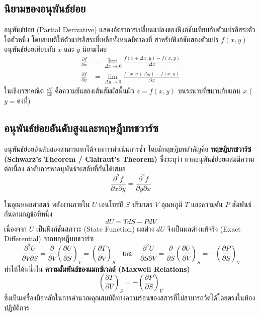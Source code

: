 \subsection{นิยามของอนุพันธ์ย่อย}
อนุพันธ์ย่อย (Partial Derivative) แสดงอัตราการเปลี่ยนแปลงของฟังก์ชันเทียบกับตัวแปรอิสระตัวใดตัวหนึ่ง โดยสมมติให้ตัวแปรอิสระที่เหลือทั้งหมดมีค่าคงที่ สำหรับฟังก์ชันสองตัวแปร $f(x, y)$ อนุพันธ์ย่อยเทียบกับ $x$ และ $y$ นิยามโดย
\begin{align}
\frac{\partial f}{\partial x} &= \lim_{\Delta x \to 0} \frac{f(x + \Delta x, y) - f(x, y)}{\Delta x} \\
\frac{\partial f}{\partial y} &= \lim_{\Delta y \to 0} \frac{f(x, y + \Delta y) - f(x, y)}{\Delta y}
\end{align}
ในเชิงเรขาคณิต $\frac{\partial f}{\partial x}$ คือความชันของเส้นสัมผัสพื้นผิว $z = f(x, y)$ บนระนาบที่ขนานกับแกน $x$ ($y = \text{คงที่}$)

\subsection{อนุพันธ์ย่อยอันดับสูงและทฤษฎีบทชวาร์ซ}
อนุพันธ์ย่อยอันดับสองสามารถหาได้จากการดำเนินการซ้ำ โดยมีทฤษฎีบทสำคัญคือ \textbf{ทฤษฎีบทชวาร์ซ (Schwarz's Theorem / Clairaut's Theorem)} ซึ่งระบุว่า หากอนุพันธ์ย่อยผสมมีความต่อเนื่อง ลำดับการหาอนุพันธ์จะสลับที่กันได้เสมอ
\begin{equation}
\frac{\partial^2 f}{\partial x \partial y} = \frac{\partial^2 f}{\partial y \partial x}
\end{equation}

\begin{maththeorem}
ในอุณหพลศาสตร์ พลังงานภายใน $U$ เอนโทรปี $S$ ปริมาตร $V$ อุณหภูมิ $T$ และความดัน $P$ สัมพันธ์กันตามกฎข้อที่หนึ่ง
\begin{equation}
dU = T dS - P dV
\end{equation}
เนื่องจาก $U$ เป็นฟังก์ชันสภาวะ (State Function) ผลต่าง $dU$ จึงเป็นผลต่างแท้จริง (Exact Differential) จากทฤษฎีบทชวาร์ซ
\begin{equation}
\frac{\partial^2 U}{\partial V \partial S} = \frac{\partial}{\partial V}\left(\frac{\partial U}{\partial S}\right)_V = \left(\frac{\partial T}{\partial V}\right)_S \quad \text{และ} \quad \frac{\partial^2 U}{\partial S \partial V} = \frac{\partial}{\partial S}\left(\frac{\partial U}{\partial V}\right)_S = -\left(\frac{\partial P}{\partial S}\right)_V
\end{equation}
ทำให้ได้หนึ่งใน \textbf{ความสัมพันธ์ของแมกซ์เวลล์ (Maxwell Relations)}
\begin{equation}
\left(\frac{\partial T}{\partial V}\right)_S = -\left(\frac{\partial P}{\partial S}\right)_V
\end{equation}
ซึ่งเป็นเครื่องมือหลักในการคำนวณคุณสมบัติทางความร้อนของสสารที่ไม่สามารถวัดได้โดยตรงในห้องปฏิบัติการ
\end{maththeorem}

